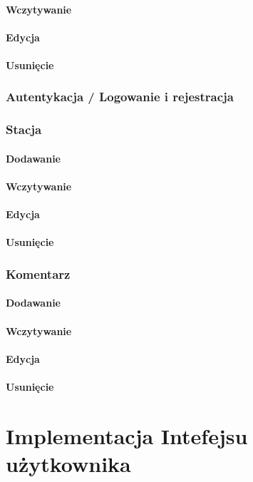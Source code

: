 \paragraph{Wczytywanie}
\paragraph{Edycja}
\paragraph{Usunięcie}
\subsubsection{Autentykacja / Logowanie i rejestracja}
\subsubsection{Stacja}
\paragraph{Dodawanie}
\paragraph{Wczytywanie}
\paragraph{Edycja}
\paragraph{Usunięcie}
\subsubsection{Komentarz}
\paragraph{Dodawanie}
\paragraph{Wczytywanie}
\paragraph{Edycja}
\paragraph{Usunięcie}
%
\section{Implementacja Intefejsu użytkownika}
